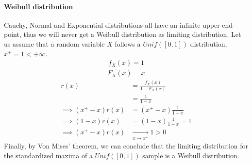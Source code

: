 \paragraph{Weibull distribution}
Cauchy, Normal and Exponential distributions all have an infinite upper end-point, thus we will never get a Weibull distribution as limiting distribution. Let us assume that a random variable $X$ follows a $Unif([0,1])$ distribution, $x^+ = 1 < + \infty$.
\begin{equation}
\begin{alignat*}{2}
f_X(x) = 1
\end{alignat*}
\end{equation}
\begin{equation}
\begin{alignat*}{2}
F_X(x) =  x
\end{alignat*}
\end{equation}
\begin{equation}
\begin{alignat*}{2}
r(x) &= \frac{f_X(x)}{1 - F_X(x)} \\
&= \frac{1}{1 - x} \\
\implies (x^+ - x) r(x) &= (x^+ - x) \frac{1}{1 - x} \\
\implies (1 - x) r(x) &= (1 - x) \frac{1}{1 - x} = 1 \\
\implies (x^+ - x) r(x) &\xrightarrow[x \rightarrow x^+]{} 1 > 0
\end{alignat*}
\end{equation}
Finally, by Von Mises' theorem, we can conclude that the limiting distribution for the standardized maxima of a $Unif([0,1])$ sample is a Weibull distribution.